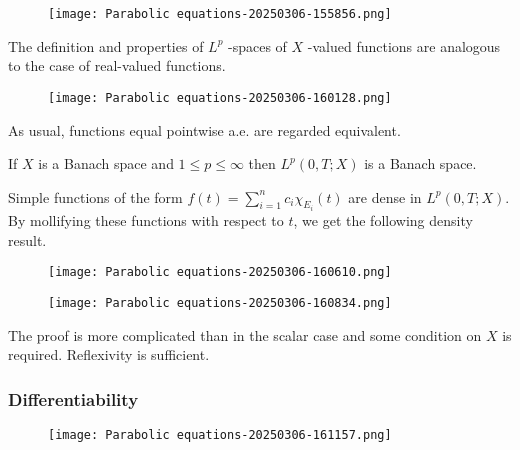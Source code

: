 \begin{theorem}
\begin{figure}[H]
\centering
\texttt{[image: Parabolic equations-20250306-155856.png]}
\label{}
\end{figure}
\end{theorem}
The definition and properties of $L^{p}$ -spaces of $X$ -valued functions are analogous to the case of real-valued functions.

\begin{definition}[$L^{p}(0,T;X)$]
\begin{figure}[H]
\centering
\texttt{[image: Parabolic equations-20250306-160128.png]}
\label{}
\end{figure}
\end{definition}
As usual, functions equal pointwise a.e. are regarded equivalent.

\begin{theorem}
If $X$ is a Banach space and $1\leq p\leq \infty$ then $L^{p}(0,T;X)$ is a Banach space.
\end{theorem}
Simple functions of the form $f(t)=\sum_{i=1}^{n}c_i\chi_{E_i}(t)$ are dense in $L^{p}(0,T;X)$. By mollifying these functions with respect to $t$, we get the following density result.

\begin{theorem}
\begin{figure}[H]
\centering
\texttt{[image: Parabolic equations-20250306-160610.png]}
\label{}
\end{figure}
\end{theorem}
\begin{theorem}
\begin{figure}[H]
\centering
\texttt{[image: Parabolic equations-20250306-160834.png]}
\label{}
\end{figure}
\end{theorem}
The proof is more complicated than in the scalar case and some condition on $X$ is required. Reflexivity is sufficient.

\subsubsection{Differentiability}

\begin{definition}
\begin{figure}[H]
\centering
\texttt{[image: Parabolic equations-20250306-161157.png]}
\label{}
\end{figure}
\end{definition}